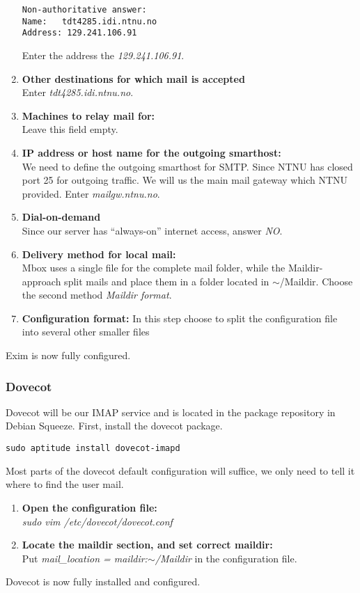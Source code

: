 \begin{enumerate}
\begin{lstlisting}
Non-authoritative answer:
Name:	tdt4285.idi.ntnu.no
Address: 129.241.106.91
\end{lstlisting}
Enter the address the \emph{129.241.106.91}.
\item\textbf{Other destinations for which mail is accepted}\\
Enter \emph{tdt4285.idi.ntnu.no}.
\item\textbf{Machines to relay mail for:}\\
Leave this field empty.
\item\textbf{IP address or host name for the outgoing smarthost:}\\
We need to define the outgoing smarthost for SMTP. Since NTNU has closed
port 25 for outgoing traffic. We will us the main mail gateway which
NTNU provided. Enter \emph{mailgw.ntnu.no}.
\item\textbf{Dial-on-demand}\\
Since our server has ``always-on'' internet access, answer \emph{NO}.
\item\textbf{Delivery method for local mail:}\\
Mbox uses a single file for the complete mail folder, while the
Maildir-approach split mails and place them in a folder located in
$\sim$/Maildir. Choose the second method \emph{Maildir format}.
\item\textbf{Configuration format:}
In this step choose to split the configuration file into several other
smaller files
\end{enumerate}
Exim is now fully configured.
\subsubsection{Dovecot}
Dovecot will be our IMAP service and is located in the package
repository in Debian Squeeze. First, install the dovecot package.
\begin{lstlisting}
sudo aptitude install dovecot-imapd
\end{lstlisting}
Most parts of the dovecot default configuration will suffice, we only
need to tell it where to find the user mail.
\begin{enumerate}
	\item\textbf{Open the configuration file:}\\
 	\emph{sudo vim /etc/dovecot/dovecot.conf}
	\item\textbf{Locate the maildir section, and set correct maildir:}\\
	Put \emph{mail\_location = maildir:$\sim$/Maildir} in the
	configuration file.
\end{enumerate}
Dovecot is now fully installed and configured.
